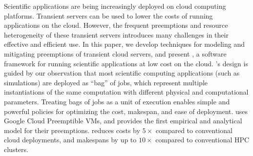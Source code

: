 Scientific applications are being increasingly deployed on cloud computing platforms.
%
Transient servers can be used to lower the costs of running applications on the cloud.
%
However, the frequent preemptions and resource heterogeneity of these transient servers introduces many challenges in their effective and efficient use.
%
In this paper, we develop techniques for modeling and mitigating preemptions of transient cloud servers, and present \sysname, a software framework for running scientific applications at low cost on the cloud.
%
\sysname's design is guided by our observation that most  scientific computing applications (such as simulations) are deployed as ``bag'' of jobs, which represent multiple instantiations of the same computation with different physical and computational parameters.
%
Treating bags of jobs as a unit of execution enables simple and powerful policies for optimizing the cost, makespan, and ease of deployment.
%
\sysname uses Google Cloud Preemptible VMs, and provides the first empirical and analytical model for their preemptions.
%
\sysname reduces costs by $5\times$ compared to conventional cloud deployments, and makespans by up to $10\times$ compared to conventional HPC clusters.









